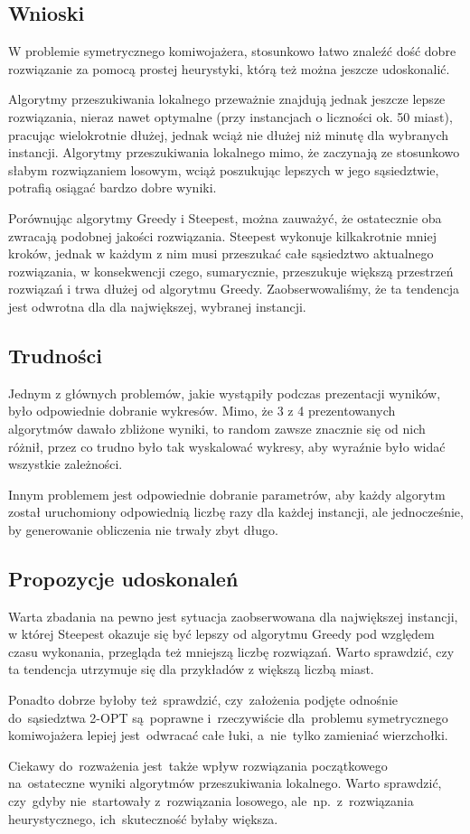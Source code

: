 \subsection{Wnioski}

W problemie symetrycznego komiwojażera, stosunkowo łatwo znaleźć dość dobre rozwiązanie za pomocą prostej heurystyki, którą też można jeszcze udoskonalić.

Algorytmy przeszukiwania lokalnego przeważnie znajdują jednak jeszcze lepsze rozwiązania, nieraz nawet optymalne (przy instancjach o liczności ok. 50 miast), pracując wielokrotnie dłużej, jednak wciąż nie dłużej niż minutę dla wybranych instancji. Algorytmy przeszukiwania lokalnego mimo, że zaczynają ze stosunkowo słabym rozwiązaniem losowym, wciąż poszukując lepszych w jego sąsiedztwie, potrafią osiągać bardzo dobre wyniki.

Porównując algorytmy Greedy i Steepest, można zauważyć, że ostatecznie oba zwracają podobnej jakości rozwiązania. Steepest wykonuje kilkakrotnie mniej kroków, jednak w każdym z nim musi przeszukać całe sąsiedztwo aktualnego rozwiązania, w konsekwencji czego, sumarycznie, przeszukuje większą przestrzeń rozwiązań i trwa dłużej od algorytmu Greedy. Zaobserwowaliśmy, że ta tendencja jest odwrotna dla dla największej, wybranej instancji.

\subsection{Trudności}

Jednym z głównych problemów, jakie wystąpiły podczas prezentacji wyników, było odpowiednie dobranie wykresów. Mimo, że 3 z 4 prezentowanych algorytmów dawało zbliżone wyniki, to random zawsze znacznie się od nich różnił, przez co trudno było tak wyskalować wykresy, aby wyraźnie było widać wszystkie zależności. 

Innym problemem jest odpowiednie dobranie parametrów, aby każdy algorytm został uruchomiony odpowiednią liczbę razy dla każdej instancji, ale jednocześnie, by generowanie obliczenia nie trwały zbyt długo.

\subsection{Propozycje udoskonaleń}

Warta zbadania na pewno jest sytuacja zaobserwowana dla największej instancji, w której Steepest okazuje się być lepszy od algorytmu Greedy pod względem czasu wykonania, przegląda też mniejszą liczbę rozwiązań. Warto sprawdzić, czy ta tendencja utrzymuje się dla przykładów z większą liczbą miast.

Ponadto dobrze byłoby też~sprawdzić, czy~założenia podjęte odnośnie do~sąsiedztwa 2-OPT są~poprawne i~rzeczywiście dla~problemu symetrycznego komiwojażera lepiej jest~odwracać całe łuki, a~nie~tylko zamieniać wierzchołki.

Ciekawy do~rozważenia jest~także wpływ rozwiązania początkowego na~ostateczne wyniki algorytmów przeszukiwania lokalnego. Warto sprawdzić, czy~gdyby nie~startowały z~rozwiązania losowego, ale~np.~z~rozwiązania heurystycznego, ich~skuteczność byłaby większa.